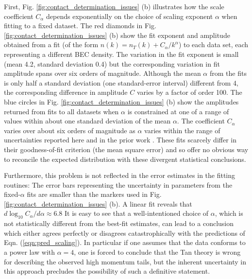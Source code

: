 	First, Fig. \ref{fig:contact_determination_issues} (b) illustrates how the scale coefficient $C_\alpha$ depends exponentially on the choice of scaling exponent $\alpha$ when fitting to a fixed dataset.
	The red diamonds in Fig. \ref{fig:contact_determination_issues} (b) show the fit exponent and amplitude obtained from a fit (of the form ${n(k)} %
	= n_T(k) + C_\alpha/k^\alpha$) to each data set, each representing a different BEC density. 
	The variation in the fit exponent is small (mean 4.2, standard deviation 0.4) but the corresponding variation in fit amplitude spans over six orders of magnitude.
	Although the mean $\alpha$ from the fits is only half a standard deviation (one standard-error interval) different from 4, the corresponding difference in amplitude $C$ varies by a factor of order 100.
	The blue circles in Fig. \ref{fig:contact_determination_issues} (b) show the amplitudes returned from fits to all datasets when $\alpha$ is constrained at one of a range of values within about one standard deviation of the mean $\alpha$. 
	The coefficient $C_\alpha$ varies over about six orders of magnitude as $\alpha$ varies within the range of uncertainties reported here and in the prior work \cite{Chang16}. 
	These fits scarcely differ in their goodness-of-fit criterion (the mean square error) and so offer no obvious way to reconcile the expected distribution with these divergent statistical conclusions.
	
	Furthermore, this problem is not reflected in the error estimates in the fitting routines: The error bars representing the uncertainty in parameters from the fixed-$\alpha$ fits are smaller than the markers used in Fig. \ref{fig:contact_determination_issues} (b). 
	A linear fit reveals that $d \log_{10} C_\alpha/d\alpha \approx 6.8$
	It is easy to see that a well-intentioned choice of $\alpha$, which is not statistically different from the best-fit estimates, can lead to a conclusion which either agrees perfectly or disagrees catastrophically with the predictions of Eqn. (\ref{eqn:pred_scaling}).
	In particular if one assumes that the data conforms to a power law with $\alpha=4$, one is forced to conclude that the Tan theory is wrong {for describing the observed high momentum tails}, but the inherent uncertainty in this approach precludes the possibility of such a definitive statement.

